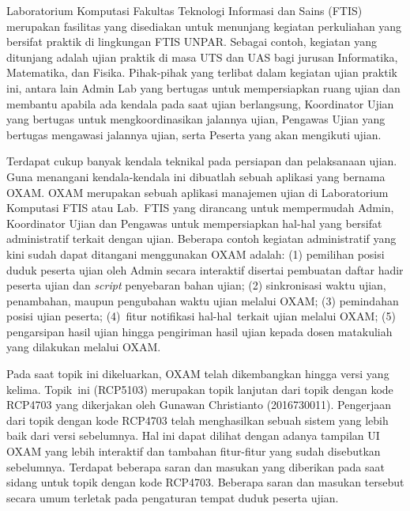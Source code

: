 \documentclass[a4paper,twoside]{article}
\begin{document}
\label{sec:deskripsi}
Laboratorium Komputasi Fakultas Teknologi Informasi dan Sains (FTIS) merupakan fasilitas yang disediakan untuk menunjang kegiatan perkuliahan yang bersifat praktik di lingkungan FTIS UNPAR. Sebagai contoh, kegiatan yang ditunjang adalah ujian praktik di masa UTS dan UAS bagi jurusan Informatika, Matematika, dan Fisika. Pihak-pihak yang terlibat dalam kegiatan ujian praktik ini, antara lain Admin Lab yang bertugas untuk mempersiapkan ruang ujian dan membantu apabila ada kendala pada saat ujian berlangsung,  Koordinator Ujian yang bertugas untuk mengkoordinasikan jalannya ujian, Pengawas Ujian yang bertugas mengawasi jalannya ujian, serta Peserta yang akan mengikuti ujian.

\setlength\parindent{24pt}

Terdapat cukup banyak kendala teknikal pada persiapan dan pelaksanaan ujian. Guna menangani kendala-kendala ini dibuatlah sebuah aplikasi yang bernama OXAM. OXAM merupakan sebuah aplikasi manajemen ujian di Laboratorium Komputasi FTIS atau Lab.~FTIS yang dirancang untuk mempermudah Admin, Koordinator Ujian dan Pengawas untuk mempersiapkan hal-hal yang bersifat administratif terkait dengan ujian. Beberapa contoh kegiatan administratif yang kini sudah dapat ditangani menggunakan OXAM adalah: (1) pemilihan posisi duduk peserta ujian oleh Admin secara interaktif disertai pembuatan daftar hadir peserta ujian dan \textit{script} penyebaran bahan ujian; (2) sinkronisasi waktu ujian, penambahan, maupun pengubahan waktu ujian melalui OXAM; (3) pemindahan posisi ujian peserta; (4)~fitur notifikasi hal-hal~terkait ujian melalui OXAM; (5) pengarsipan hasil ujian  hingga pengiriman hasil ujian kepada dosen matakuliah yang dilakukan melalui OXAM.

Pada saat topik ini dikeluarkan, OXAM telah dikembangkan hingga versi yang kelima. Topik~ini (RCP5103) merupakan topik lanjutan dari topik dengan kode RCP4703 yang dikerjakan oleh Gunawan Christianto (2016730011). Pengerjaan dari topik dengan kode RCP4703 telah menghasilkan sebuah sistem yang lebih baik dari versi sebelumnya. Hal ini dapat dilihat dengan adanya tampilan UI OXAM yang lebih interaktif dan tambahan fitur-fitur yang sudah disebutkan sebelumnya. Terdapat beberapa saran dan masukan yang diberikan pada saat sidang untuk topik dengan kode RCP4703. Beberapa saran dan masukan tersebut secara umum terletak pada pengaturan tempat duduk peserta ujian.
\end{document}
